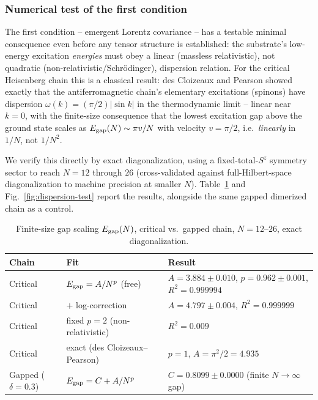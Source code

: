 \documentclass[11pt]{article}
\begin{document}
\subsubsection*{Numerical test of the first condition}

The first condition -- emergent Lorentz covariance -- has a testable minimal consequence even before any tensor structure is established: the substrate's low-energy excitation \emph{energies} must obey a linear (massless relativistic), not quadratic (non-relativistic/Schr\"odinger), dispersion relation. For the critical Heisenberg chain this is a classical result: des Cloizeaux and Pearson showed exactly that the antiferromagnetic chain's elementary excitations (spinons) have dispersion $\omega(k) = (\pi/2)|\sin k|$ in the thermodynamic limit \cite{DesCloizeauxPearson} -- linear near $k=0$, with the finite-size consequence that the lowest excitation gap above the ground state scales as $E_{\rm gap}(N)\sim \pi v/N$ with velocity $v=\pi/2$, i.e.\ \emph{linearly} in $1/N$, not $1/N^2$.

We verify this directly by exact diagonalization, using a fixed-total-$S^z$ symmetry sector to reach $N=12$ through $26$ (cross-validated against full-Hilbert-space diagonalization to machine precision at smaller $N$). Table~\ref{tab:dispersion-test} and Fig.~\ref{fig:dispersion-test} report the results, alongside the same gapped dimerized chain as a control.

\begin{table}[h]
\centering
\caption{Finite-size gap scaling $E_{\rm gap}(N)$, critical vs.\ gapped chain, $N=12$--$26$, exact diagonalization.}
\label{tab:dispersion-test}
\begin{tabular}{@{}lll@{}}
\toprule
Chain & Fit & Result \\
\midrule
Critical & $E_{\rm gap}=A/N^p$ (free) & $A=3.884\pm0.010$, $p=0.962\pm0.001$, $R^2=0.999994$ \\
Critical & $+$ log-correction & $A=4.797\pm0.004$, $R^2=0.999999$ \\
Critical & fixed $p=2$ (non-relativistic) & $R^2=0.009$ \\
Critical & exact (des Cloizeaux--Pearson) & $p=1$, $A=\pi^2/2=4.935$ \\
Gapped ($\delta=0.3$) & $E_{\rm gap}=C+A/N^p$ & $C=0.8099\pm0.0000$ (finite $N\to\infty$ gap) \\
\bottomrule
\end{tabular}
\end{table}
\end{document}
